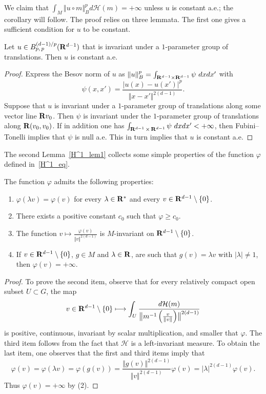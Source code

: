 We claim that $\int _M \Vert u \circ m \Vert _B ^p d\mathcal H (m) = +\infty$ unless $u$ is constant a.e.; the corollary will follow. The proof relies on three lemmata. The first one gives a sufficient condition for $u$ to be constant.

\begin{lemm}\label{H^1_lem0}
Let $u \in B_{p,\,p} ^{(d-1)/p} ({\bf R} ^{d-1})$ that is invariant under a $1$-parameter group of translations. Then $u$ is constant a.e.
\end{lemm}

\begin{proof}
Express the Besov norm of $u$ as $\Vert u \Vert _B ^p = \int _{{\bf R} ^{d-1} \times {\bf R} ^{d-1}} \psi~dxdx'$ with
\[
\psi (x,x') = \frac{\vert u(x) - u(x') \vert ^p}{\Vert x - x' \Vert ^{2(d-1)}}.
\]
Suppose that $u$ is invariant under a $1$-parameter group of translations along some vector line ${\bf R}v_0$. Then $\psi$ is invariant under the $1$-parameter group of translations along ${\bf R}(v_0, v_0)$. If in addition one has $\int _{{\bf R}^{d-1}\,\times\,{\bf R}^{d-1}} \psi~dxdx' < +\infty$, then Fubini--Tonelli implies that $\psi$ is null a.e. This in turn implies that $u$ is constant a.e.
\end{proof}

The second Lemma~\ref{H^1_lem1} collects some simple properties of the function $\varphi$ defined in~\eqref{H^1_eq}.

\begin{lemm}\label{H^1_lem1}
The function $\varphi$ admits the following properties:
\begin{enumerate}
\item $\varphi (\lambda v) = \varphi (v)$ for every $\lambda \in {\bf R}^*$ and every $v \in {\bf R} ^{d-1} \setminus \{0 \}$.
\item There exists a positive constant $c_0$ such that $\varphi \geqslant c_0$.
\item The function $v \mapsto \frac{\varphi (v)}{\Vert v \Vert ^{2(d-1)}}$ is $M$-invariant on ${\bf R} ^{d-1} \setminus \{0 \}$.
\item If $v \in {\bf R} ^{d-1} \setminus \{0 \}$, $g \in M$ and $\lambda \in {\bf R}$, are such that $g(v) = \lambda v$ with $\vert \lambda \vert \neq 1$, then $\varphi (v) = +\infty$.
\end{enumerate}
\end{lemm}

\begin{proof}
To prove the second item, observe that for every relatively compact open subset $U \subset G$, the map
\[
v \in {\bf R} ^{d-1} \setminus \{0 \} \longmapsto \int _U \frac{d \mathcal H (m)}{\bigl\Vert m^{-1} \left(\frac{v}{\Vert v \Vert}\right) \bigr\Vert ^{2(d-1)}}
\]
is positive, continuous, invariant by scalar multiplication, and smaller that $\varphi$. The third item follows from the fact that $\mathcal H$ is a left-invariant measure. To obtain the last item, one observes that the first and third items imply that
\[
\varphi (v) = \varphi (\lambda v) = \varphi (g(v)) = \frac{\Vert g(v) \Vert ^{2(d-1)}}{\Vert v \Vert ^{2(d-1)}} \varphi (v)
= \vert \lambda \vert ^{2(d-1)} \varphi (v).
\]
Thus $\varphi (v) = +\infty$ by (2).
\end{proof}

